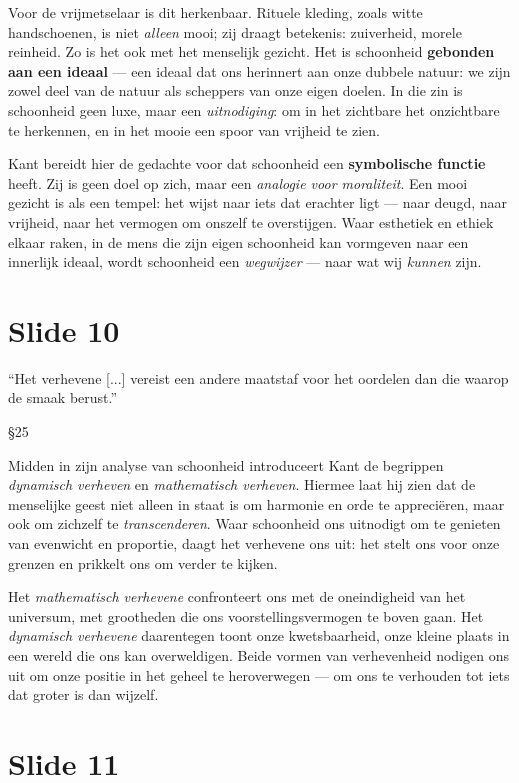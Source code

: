 \documentclass{article}
\begin{document}
Voor de vrijmetselaar is dit herkenbaar. Rituele kleding, zoals witte handschoenen, is niet \textit{alleen} mooi; zij draagt betekenis: zuiverheid, morele reinheid. Zo is het ook met het menselijk gezicht. Het is schoonheid \textbf{gebonden aan een ideaal} --- een ideaal dat ons herinnert aan onze dubbele natuur: we zijn zowel deel van de natuur als scheppers van onze eigen doelen. In die zin is schoonheid geen luxe, maar een \textit{uitnodiging}: om in het zichtbare het onzichtbare te herkennen, en in het mooie een spoor van vrijheid te zien.

Kant bereidt hier de gedachte voor dat schoonheid een \textbf{symbolische functie} heeft. Zij is geen doel op zich, maar een \textit{analogie voor moraliteit}. Een mooi gezicht is als een tempel: het wijst naar iets dat erachter ligt --- naar deugd, naar vrijheid, naar het vermogen om onszelf te overstijgen. Waar esthetiek en ethiek elkaar raken, in de mens die zijn eigen schoonheid kan vormgeven naar een innerlijk ideaal, wordt schoonheid een \textit{wegwijzer} --- naar wat wij \textit{kunnen} zijn.

\section*{Slide 10}

\epigraph{``Het verhevene [...] vereist een andere maatstaf voor het oordelen dan die waarop de smaak berust.''}{§25}

Midden in zijn analyse van schoonheid introduceert Kant de begrippen \textit{dynamisch verheven} en \textit{mathematisch verheven}. Hiermee laat hij zien dat de menselijke geest niet alleen in staat is om harmonie en orde te appreciëren, maar ook om zichzelf te \textit{transcenderen}. Waar schoonheid ons uitnodigt om te genieten van evenwicht en proportie, daagt het verhevene ons uit: het stelt ons voor onze grenzen en prikkelt ons om verder te kijken.

Het \textit{mathematisch verhevene} confronteert ons met de oneindigheid van het universum, met grootheden die ons voorstellingsvermogen te boven gaan. Het \textit{dynamisch verhevene} daarentegen toont onze kwetsbaarheid, onze kleine plaats in een wereld die ons kan overweldigen. Beide vormen van verhevenheid nodigen ons uit om onze positie in het geheel te heroverwegen --- om ons te verhouden tot iets dat groter is dan wijzelf.

\section*{Slide 11}
\end{document}
